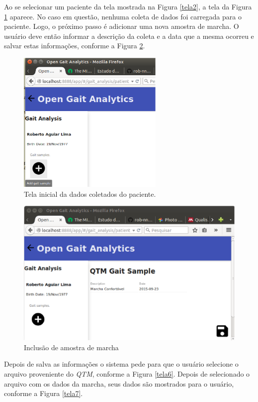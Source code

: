 Ao se selecionar um paciente da tela mostrada na Figura \ref{tela2}, a tela da Figura \ref{tela4} aparece. No caso em questão, nenhuma coleta de dados foi carregada para o paciente. Logo, o próximo passo é adicionar uma nova amostra de marcha.
O usuário deve então informar a descrição da coleta e a data que a mesma ocorreu e salvar estas informações, conforme a Figura \ref{tela5}.

\begin{figure}[H]
	\centering
	\includegraphics[width=7cm]{figuras/tela4.eps}
	\caption{Tela inicial da dados coletados do paciente.}
	\label{tela4}
\end{figure}


\begin{figure}[H]
	\centering
	\includegraphics[width=15cm]{figuras/tela5.eps}
	\caption{Inclusão de amostra de marcha}

	\label{tela5}
\end{figure}



Depois de salva as informações o sistema pede para que o usuário selecione o arquivo proveniente do \emph{QTM}, conforme a Figura \ref{tela6}.
Depois de selecionado o arquivo com os dados da marcha, seus dados são mostrados para o usuário, conforme a Figura \ref{tela7}.

